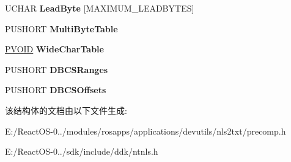\begin{DoxyCompactItemize}
U\+C\+H\+AR {\bfseries Lead\+Byte} \mbox{[}M\+A\+X\+I\+M\+U\+M\+\_\+\+L\+E\+A\+D\+B\+Y\+T\+ES\mbox{]}
\item 
\mbox{\label{struct___c_p_t_a_b_l_e_i_n_f_o_a583a431c190b587c78102bccb4691946}} 
P\+U\+S\+H\+O\+RT {\bfseries Multi\+Byte\+Table}
\item 
\mbox{\label{struct___c_p_t_a_b_l_e_i_n_f_o_aba66b4217503354e195a39057063c92e}} 
\hyperlink{interfacevoid}{P\+V\+O\+ID} {\bfseries Wide\+Char\+Table}
\item 
\mbox{\label{struct___c_p_t_a_b_l_e_i_n_f_o_a2d775dfd84ef39d930f1acc4614fce04}} 
P\+U\+S\+H\+O\+RT {\bfseries D\+B\+C\+S\+Ranges}
\item 
\mbox{\label{struct___c_p_t_a_b_l_e_i_n_f_o_a9a58428566d7d11d03f6a22f85f03c79}} 
P\+U\+S\+H\+O\+RT {\bfseries D\+B\+C\+S\+Offsets}
\end{DoxyCompactItemize}


该结构体的文档由以下文件生成\+:\begin{DoxyCompactItemize}
\item 
E\+:/\+React\+O\+S-\/0../modules/rosapps/applications/devutils/nls2txt/precomp.\+h\item 
E\+:/\+React\+O\+S-\/0../sdk/include/ddk/ntnls.\+h\end{DoxyCompactItemize}
